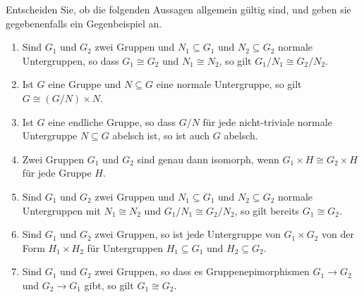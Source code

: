 \begin{question}[subtitle = Multiple Choice I]
  Entscheiden Sie, ob die folgenden Aussagen allgemein gültig sind, und geben sie gegebenenfalls ein Gegenbeispiel an.
  \begin{enumerate}
    \item
      Sind $G_1$ und $G_2$ zwei Gruppen und $N_1 \subseteq G_1$ und $N_2 \subseteq G_2$ normale Untergruppen, so dass $G_1 \cong G_2$ und $N_1 \cong N_2$, so gilt $G_1/N_1 \cong G_2/N_2$.
    \item
      Ist $G$ eine Gruppe und $N \subseteq G$ eine normale Untergruppe, so gilt $G \cong (G/N) \times N$.
    \item
      Ist $G$ eine endliche Gruppe, so dass $G/N$ für jede nicht-triviale normale Untergruppe $N \subseteq G$ abelsch ist, so ist auch $G$ abelsch.
    \item
      Zwei Gruppen $G_1$ und $G_2$ sind genau dann isomorph, wenn $G_1 \times H \cong G_2 \times H$ für jede Gruppe $H$.
    \item
      Sind $G_1$ und $G_2$ zwei Gruppen und $N_1 \subseteq G_1$ und $N_2 \subseteq G_2$ normale Untergruppen mit $N_1 \cong N_2$ und $G_1/N_1 \cong G_2/N_2$, so gilt bereits $G_1 \cong G_2$.
    \item
      Sind $G_1$ und $G_2$ zwei Gruppen, so ist jede Untergruppe von $G_1 \times G_2$ von der Form $H_1 \times H_2$ für Untergruppen $H_1 \subseteq G_1$ und $H_2 \subseteq G_2$.
    \item
      Sind $G_1$ und $G_2$ zwei Gruppen, so dass es Gruppenepimorphismen $G_1 \to G_2$ und $G_2 \to G_1$ gibt, so gilt $G_1 \cong G_2$.
  \end{enumerate}
\end{question}


